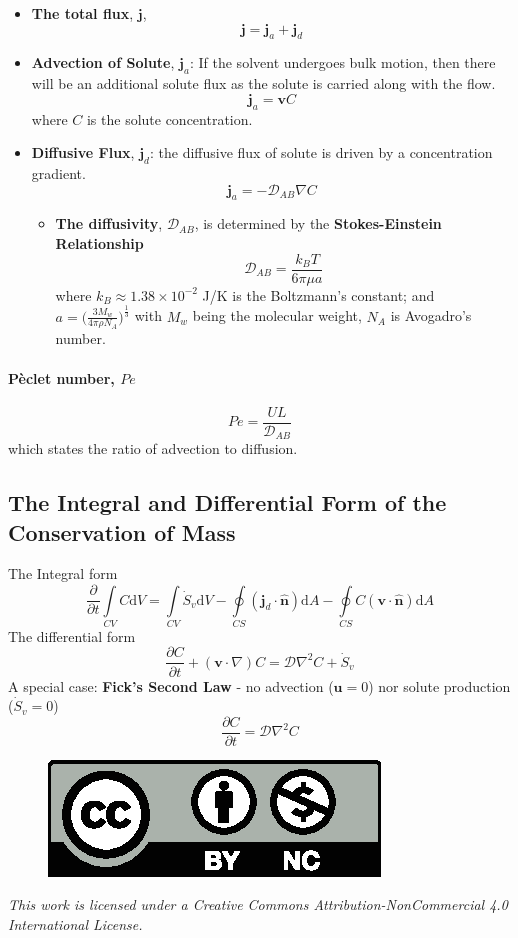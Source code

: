 \documentclass[12pt, a4paper]{article}
\begin{document}
\begin{itemize}
    \item \textbf{The total flux}, $\bm{j}$, 
    \[
    \bm{j} = \bm{j}_a + \bm{j}_d
    \]
    
    \item \textbf{Advection of Solute}, $\bm{j}_a$: If the solvent undergoes bulk motion, then there will be an additional solute flux as the solute is carried along with the flow.
    \[
        \bm{j}_a = \bm{v}C
    \]
    where $C$ is the solute concentration.
    
    \item \textbf{Diffusive Flux}, $\bm{j}_d$: the diffusive flux of solute is driven by a concentration gradient.
    \[
        \bm{j}_a = -\mathcal{D}_{AB}\nabla C
    \]
        \begin{itemize}
            \item \textbf{The diffusivity}, $\mathcal{D}_{AB}$, is determined by the \textbf{Stokes-Einstein Relationship}
            \[
               \mathcal{D}_{AB} = \frac{k_{B}T}{6\pi \mu a} 
            \]
            where $k_B \approx 1.38\times 10^{-2}$ J/K is the Boltzmann's constant; and $\displaystyle a = \bigg(\frac{3M_w}{4\pi \rho N_A}\bigg)^{\frac{1}{3}}$ with $M_w$ being the molecular weight, $N_A$ is Avogadro’s number.
        \end{itemize}
\end{itemize}
\paragraph{P\`eclet number, $Pe$}
\[
    Pe = \frac{U L}{\mathcal{D}_{AB}}
\]
which states the ratio of advection to diffusion.

\subsection{The Integral and Differential Form of the Conservation of Mass}
The Integral form
\[
    \frac{\partial}{\partial t} \int\limits_{CV} C \mathrm{d}V = \int\limits_{CV} \dot{S}_v \mathrm{d}V - \oint\limits_{CS} (\bm{j}_d \cdot \hat{\bm{n}}) \mathrm{d}A - \oint\limits_{CS} C (\bm{v} \cdot \hat{\bm{n}}) \mathrm{d}A
\]
The differential form
\[
    \frac{\partial C}{\partial t} + (\bm{v} \cdot \nabla)C = \mathcal{D}\nabla^2 C + \dot{S}_{v}
\]
A special case: \textbf{Fick's Second Law} - no advection ($\bm{u}=0$) nor solute production ($\dot{S}_{v}=0$)
\[
    \frac{\partial C}{\partial t} = \mathcal{D}\nabla^2 C
\]

\newpage
\thispagestyle{empty}
\mbox{}
\vfill    
\begin{figure}[H]
    \includegraphics[right]{img/by-nc.eps}
\end{figure}
\textit{This work is licensed under a Creative Commons Attribution-NonCommercial 4.0 International License.}
\end{document}
